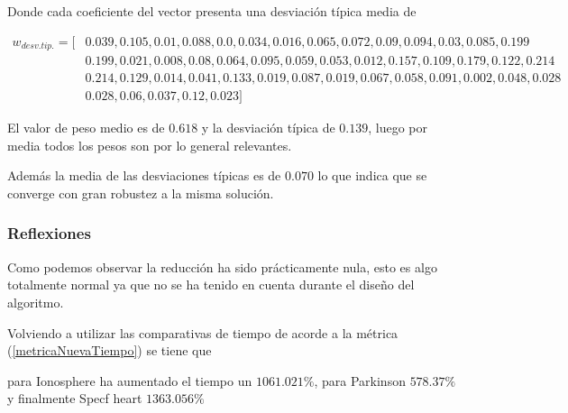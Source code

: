 Donde cada coeficiente del vector presenta una desviación típica media de 

\begin{align*}
  w_{desv. tip.} = [ 
    &  0.039,0.105, 0.01, 0.088, 0.0, 0.034, 0.016, 0.065, 0.072, 0.09, 0.094, 0.03, 0.085, 0.199  \\
    &  0.199, 0.021, 0.008, 0.08, 0.064, 0.095, 0.059, 0.053, 0.012, 0.157, 0.109, 0.179, 0.122, 0.214  \\
    &  0.214, 0.129, 0.014, 0.041, 0.133, 0.019, 0.087, 0.019, 0.067, 0.058, 0.091, 0.002, 0.048, 0.028  \\
    &  0.028, 0.06, 0.037, 0.12, 0.023 
   ]
\end{align*}

El valor de peso medio es de $0.618$ y la desviación típica de $0.139$, luego por media todos los pesos son por lo general relevantes. 

Además la media de las desviaciones típicas es de $0.070$ lo que indica que se converge con gran robustez a la misma solución.

\subsubsection*{Reflexiones}

Como podemos observar la reducción ha sido prácticamente nula, esto es algo totalmente 
normal ya que no se ha tenido en cuenta durante el diseño del algoritmo.

Volviendo a utilizar las comparativas de tiempo 
de acorde a la métrica (\ref{metricaNuevaTiempo}) se tiene que 

para Ionosphere ha aumentado el tiempo un $1061.021 \%$, para 
Parkinson $578.37 \%$ y finalmente 
Specf heart $1363.056 \%$  

